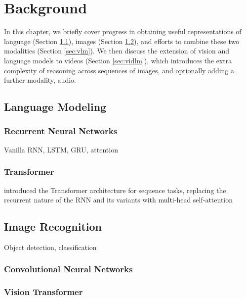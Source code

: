 
\chapter{Background}
\label{chap:bg}

In this chapter, we briefly cover progress in obtaining useful representations
of language (Section \ref{sec:lm}), images (Section \ref{sec:imrec}), and
efforts to combine these two modalities (Section \ref{sec:vlm}). We then
discuss the extension of vision and language models to videos (Section
\ref{sec:vidlm}), which introduces the extra complexity of reasoning across
sequences of images, and optionally adding a further modality, audio. 

\section{Language Modeling}
\label{sec:lm}

\subsection{Recurrent Neural Networks}
\label{ssec:rnn}

Vanilla RNN, LSTM, GRU, attention
	
\subsection{Transformer}
\label{ssec:transformer}

\cite{vaswani2017attention} introduced the Transformer architecture for sequence tasks, replacing the recurrent nature of the RNN and its variants with multi-head self-attention

\section{Image Recognition}
\label{sec:imrec}

Object detection, classification

\subsection{Convolutional Neural Networks}
\label{ssec:cnn}


\subsection{Vision Transformer}
\label{ssec:vit}

